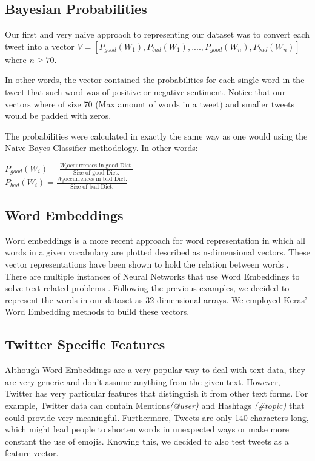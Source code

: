 \documentclass[11pt,onecolumn]{article} %
\begin{document}
	\subsection{Bayesian Probabilities}
	Our first and very naive approach to representing our dataset was to convert each tweet into a vector $V=[P_{good}(W_1),P_{bad}(W_1),....,P_{good}(W_n),P_{bad}(W_n)]$ where $n \geq 70$. 
	\par In other words, the vector contained the probabilities for each single word in the tweet that such word was of positive or negative sentiment. Notice that our vectors where of size 70 (Max amount of words in a tweet) and smaller tweets would be padded with zeros.
	\par The probabilities were calculated in exactly the same way as one would using the Naive Bayes Classifier methodology. In other words:
	\begin{center}
		$P_{good}(W_i)= \frac{W_i \text{occurrences in good Dict.}}{ \text{Size of good Dict.}}$\\
		$P_{bad}(W_i)= \frac{W_i \text{occurrences in bad Dict.}}{ \text{Size of bad Dict.}}$
	\end{center}
	
	
	\subsection{Word Embeddings}
	Word embeddings is a more recent approach for word representation in which all words in a given vocabulary are plotted described as n-dimensional vectors. These vector representations have been shown to hold the relation between words  \cite{goldberg2014word2vec,mikolovword2vec}. There are multiple instances of Neural Networks that use Word Embeddings to solve text related problems  \cite{tang2014learning,maas2011learning,tang2014coooolll}. Following the previous examples, we decided to represent the words in our dataset as 32-dimensional arrays. We employed Keras' Word Embedding methods to build these vectors.
	
	\subsection{Twitter Specific Features}
	Although Word Embeddings are a very popular way to deal with text data, they are very generic and don't assume anything from the given text. However, Twitter has very particular features that distinguish it from other text forms. For example, Twitter data can contain Mentions\textit{(@user)} and Hashtags \textit{(\#topic)} that could provide very meaningful. Furthermore, Tweets are only 140 characters long, which might lead people to shorten words in unexpected ways or make more constant the use of emojis. Knowing this, we decided to also test  tweets as a feature vector.
	
\end{document}
